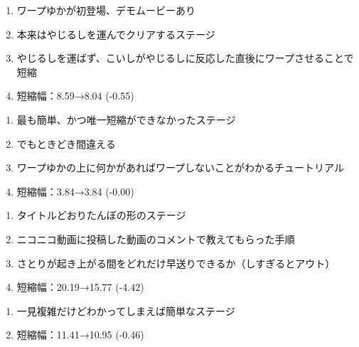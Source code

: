 \begin{enumerate}[label={\sarrow}]
\item ワープゆかが初登場、デモムービーあり
\item 本来はやじるしを運んでクリアするステージ
\item やじるしを運ばず、こいしがやじるしに反応した直後にワープさせることで短縮
\item 短縮幅：8.59→8.04 (-0.55)
\end{enumerate}



\begin{enumerate}[label={\sarrow}]
\item 最も簡単、かつ唯一短縮ができなかったステージ
\item でもときどき間違える
\item ワープゆかの上に何かがあればワープしないことがわかるチュートリアル
\item 短縮幅：3.84→3.84 (-0.00)
\end{enumerate}



\begin{enumerate}[label={\sarrow}]
\item タイトルどおりたんぼの形のステージ
\item ニコニコ動画に投稿した動画のコメントで教えてもらった手順
\item さとりが起き上がる間をどれだけ早送りできるか（しすぎるとアウト）
\item 短縮幅：20.19→15.77 (-4.42)
\end{enumerate}



\begin{enumerate}[label={\sarrow}]
\item 一見複雑だけどわかってしまえば簡単なステージ
\item 短縮幅：11.41→10.95 (-0.46)
\end{enumerate}



